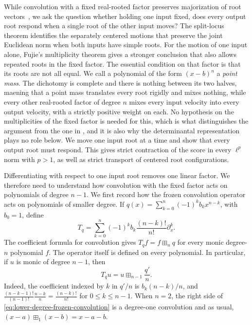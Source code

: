 \documentclass[12pt,reqno]{amsart}
\theoremstyle{definition}
\theoremstyle{remark}
\begin{document}
While convolution with a fixed real-rooted factor preserves majorization of root vectors~\cite{BorceaBranden10,LeakeRyder18}, we ask the question whether holding one input fixed, does every output root respond when a single root of the other input moves? The split-locus theorem identifies the separately centered motions that preserve the joint Euclidean norm when both inputs have simple roots. For the motion of one input alone, Fujie's multiplicity theorem gives a stronger conclusion that also allows repeated roots in the fixed factor. The essential condition on that factor is that its roots are not all equal. We call a polynomial of the form \((x-b)^n\) a \emph{point mass}. 
The dichotomy is complete and there is nothing between its two halves, maening that a point mass translates every root rigidly and mixes nothing, while every other real-rooted factor of degree \(n\) mixes every input velocity into every output velocity, with a strictly positive weight on each. No hypothesis on the multiplicities of the fixed factor is needed for this, which is what distinguishes the argument from the one in , and it is also why the determinantal representation plays no role below. We move one input root at a time and show that every output root must respond. This gives strict contraction of the score in every \(\ell^p\) norm with \(p>1\), as well as strict transport of centered root configurations.

Differentiating with respect to one input root removes one linear factor. We therefore need to understand how convolution with the fixed factor acts on polynomials of degree \(n-1\). We first record how the frozen convolution operator acts on polynomials
of smaller degree.  If
\(q(x)=\sum_{k=0}^n(-1)^k b_kx^{n-k}\), with \(b_0=1\), define
\begin{equation}\label{eq:frozen-convolution-operator}
 T_q=\sum_{k=0}^n(-1)^k b_k\frac{(n-k)!}{n!}\partial_x^k.
\end{equation}
The coefficient formula for convolution gives \(T_qf=f\boxplus_nq\)
for every monic degree-\(n\) polynomial \(f\).  The operator itself is
defined on every polynomial.  In particular, if \(u\) is monic of degree
\(n-1\), then
\begin{equation}\label{eq:lower-degree-frozen-convolution}
 T_qu=u\boxplus_{n-1}\frac{q'}n.
\end{equation}
Indeed, the coefficient indexed by \(k\) in \(q'/n\) is
\(b_k(n-k)/n\), and
\(\frac{(n-k-1)!}{(n-1)!}\frac{n-k}{n}
=\frac{(n-k)!}{n!}\) for \(0\leq k\leq n-1\).
When \(n=2\), the right side of \eqref{eq:lower-degree-frozen-convolution} is a degree-one convolution and as usual, \((x-a)\boxplus_1(x-b)=x-a-b\).
\end{document}
